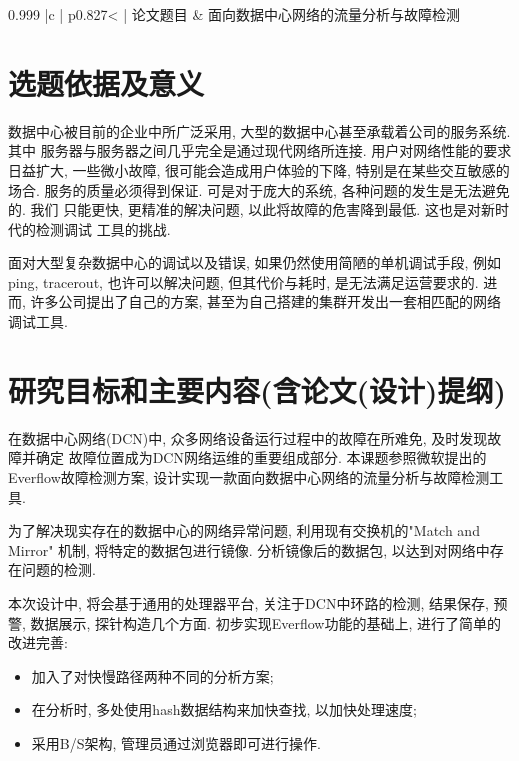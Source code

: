 
\vspace{-4pt}
{

\noindent
\begin{tabular*}{0.999\textwidth}
    {|c | p{}< {\centering} |}
    \hline
    {\songti 论文题目} & {\songti 面向数据中心网络的流量分析与故障检测} \\ 
    \hline
\end{tabular*}
\indent

\begin{mdframed}[everyline=true]

\section{选题依据及意义}

数据中心被目前的企业中所广泛采用, 大型的数据中心甚至承载着公司的服务系统. 其中
服务器与服务器之间几乎完全是通过现代网络所连接. 用户对网络性能的要求日益扩大,
一些微小故障, 很可能会造成用户体验的下降, 特别是在某些交互敏感的场合.
服务的质量必须得到保证. 可是对于庞大的系统, 各种问题的发生是无法避免的. 我们
只能更快, 更精准的解决问题, 以此将故障的危害降到最低. 这也是对新时代的检测调试
工具的挑战.


面对大型复杂数据中心的调试以及错误, 如果仍然使用简陋的单机调试手段,
例如ping, tracerout, 也许可以解决问题, 但其代价与耗时, 是无法满足运营要求的.
进而, 许多公司提出了自己的方案, 甚至为自己搭建的集群开发出一套相匹配的网络调试工具.


\section{研究目标和主要内容(含论文(设计)提纲)}

在数据中心网络(DCN)中, 众多网络设备运行过程中的故障在所难免, 及时发现故障并确定 
故障位置成为DCN网络运维的重要组成部分. 本课题参照微软提出的Everflow故障检测方案,
设计实现一款面向数据中心网络的流量分析与故障检测工具.

为了解决现实存在的数据中心的网络异常问题, 利用现有交换机的"Match and Mirror"
机制, 将特定的数据包进行镜像. 分析镜像后的数据包, 以达到对网络中存在问题的检测.

本次设计中, 将会基于通用的处理器平台, 关注于DCN中环路的检测, 结果保存, 预警,
数据展示, 探针构造几个方面. 初步实现Everflow功能的基础上, 进行了简单的改进完善:

\begin{itemize}
    \setlength\itemsep{0.1em}
    \item 加入了对快慢路径两种不同的分析方案;
    \item 在分析时, 多处使用hash数据结构来加快查找, 以加快处理速度;
    \item 采用B/S架构, 管理员通过浏览器即可进行操作.
\end{itemize}


\end{mdframed}}
